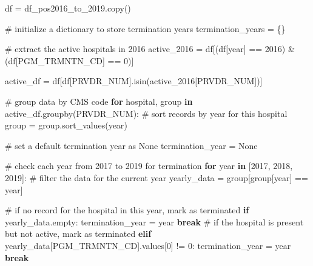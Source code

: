 \documentclass[
  letterpaper,
  DIV=11,
  numbers=noendperiod]{scrartcl}
\newenvironment{Shaded}{\begin{snugshade}}{\end{snugshade}}
\newcommand{\CommentTok}[1]{\textcolor[rgb]{0.37,0.37,0.37}{#1}}
\newcommand{\ControlFlowTok}[1]{\textcolor[rgb]{0.00,0.23,0.31}{\textbf{#1}}}
\newcommand{\DecValTok}[1]{\textcolor[rgb]{0.68,0.00,0.00}{#1}}
\newcommand{\KeywordTok}[1]{\textcolor[rgb]{0.00,0.23,0.31}{\textbf{#1}}}
\newcommand{\NormalTok}[1]{\textcolor[rgb]{0.00,0.23,0.31}{#1}}
\newcommand{\OperatorTok}[1]{\textcolor[rgb]{0.37,0.37,0.37}{#1}}
\newcommand{\StringTok}[1]{\textcolor[rgb]{0.13,0.47,0.30}{#1}}
\newcommand{\VariableTok}[1]{\textcolor[rgb]{0.07,0.07,0.07}{#1}}
\begin{document}
\begin{Shaded}
\begin{Highlighting}[]
\NormalTok{df }\OperatorTok{=}\NormalTok{ df\_pos2016\_to\_2019.copy()}

\CommentTok{\# initialize a dictionary to store termination years}
\NormalTok{termination\_years }\OperatorTok{=}\NormalTok{ \{\}}

\CommentTok{\# extract the active hospitals in 2016}
\NormalTok{active\_2016 }\OperatorTok{=}\NormalTok{ df[(df[}\StringTok{\textquotesingle{}year\textquotesingle{}}\NormalTok{] }\OperatorTok{==} \DecValTok{2016}\NormalTok{) }\OperatorTok{\&}\NormalTok{ (df[}\StringTok{\textquotesingle{}PGM\_TRMNTN\_CD\textquotesingle{}}\NormalTok{] }\OperatorTok{==} \DecValTok{0}\NormalTok{)]}

\NormalTok{active\_df }\OperatorTok{=}\NormalTok{ df[df[}\StringTok{\textquotesingle{}PRVDR\_NUM\textquotesingle{}}\NormalTok{].isin(active\_2016[}\StringTok{\textquotesingle{}PRVDR\_NUM\textquotesingle{}}\NormalTok{])]}

\CommentTok{\# group data by CMS code}
\ControlFlowTok{for}\NormalTok{ hospital, group }\KeywordTok{in}\NormalTok{ active\_df.groupby(}\StringTok{\textquotesingle{}PRVDR\_NUM\textquotesingle{}}\NormalTok{):}
    \CommentTok{\# sort records by year for this hospital}
\NormalTok{    group }\OperatorTok{=}\NormalTok{ group.sort\_values(}\StringTok{\textquotesingle{}year\textquotesingle{}}\NormalTok{)}

    \CommentTok{\# set a default termination year as None}
\NormalTok{    termination\_year }\OperatorTok{=} \VariableTok{None}

    \CommentTok{\# check each year from 2017 to 2019 for termination}
    \ControlFlowTok{for}\NormalTok{ year }\KeywordTok{in}\NormalTok{ [}\DecValTok{2017}\NormalTok{, }\DecValTok{2018}\NormalTok{, }\DecValTok{2019}\NormalTok{]:}
        \CommentTok{\# filter the data for the current year}
\NormalTok{        yearly\_data }\OperatorTok{=}\NormalTok{ group[group[}\StringTok{\textquotesingle{}year\textquotesingle{}}\NormalTok{] }\OperatorTok{==}\NormalTok{ year]}

        \CommentTok{\# if no record for the hospital in this year, mark as terminated}
        \ControlFlowTok{if}\NormalTok{ yearly\_data.empty:}
\NormalTok{            termination\_year }\OperatorTok{=}\NormalTok{ year}
            \ControlFlowTok{break}
        \CommentTok{\# if the hospital is present but not active, mark as terminated}
        \ControlFlowTok{elif}\NormalTok{ yearly\_data[}\StringTok{\textquotesingle{}PGM\_TRMNTN\_CD\textquotesingle{}}\NormalTok{].values[}\DecValTok{0}\NormalTok{] }\OperatorTok{!=} \DecValTok{0}\NormalTok{:}
\NormalTok{            termination\_year }\OperatorTok{=}\NormalTok{ year}
            \ControlFlowTok{break}


\end{Highlighting}
\end{Shaded}
\end{document}
